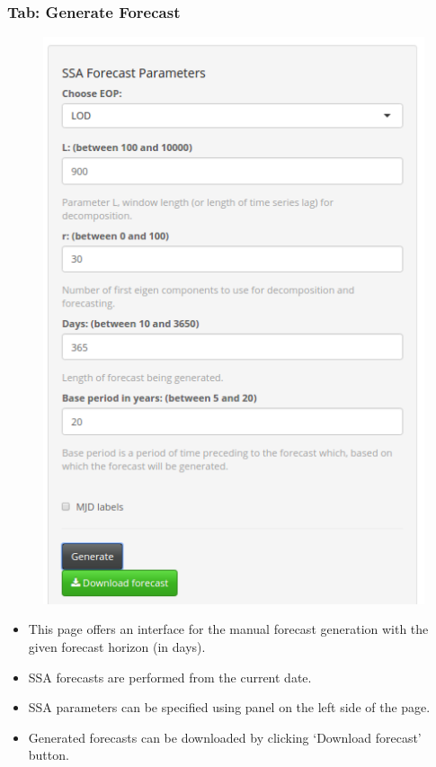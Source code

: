 \documentclass[pdf, unicode, notheorems, xcolor={table}]{beamer}
\begin{document}
\begin{frame}\frametitle{Tab: Generate Forecast}
	\begin{minipage}[t]{0.48\linewidth}
		\begin{figure}
			\includegraphics[width=\linewidth]{generate_params}
		\end{figure}
	\end{minipage}%
	\hfill%
	\begin{minipage}[t]{0.48\linewidth}
		\begin{itemize}
		\item This page offers an interface for the manual forecast generation with the given forecast horizon (in days).

		\item SSA forecasts are performed from the current date.

		\item SSA parameters can be specified using panel on the left side of the page.
		
		\item Generated forecasts can be downloaded by clicking `Download forecast' button.
		\end{itemize}
	\end{minipage}
\end{frame}
\end{document}
